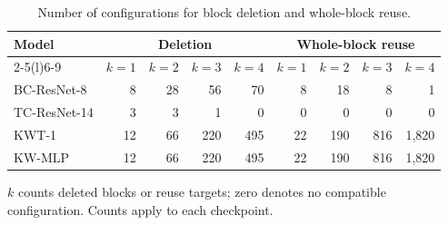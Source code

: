 \begin{table}[htbp]
\caption{Number of configurations for block deletion and whole-block reuse.}
\label{tab:structure_summary}
\centering\small
\setlength{\tabcolsep}{3pt}
\begin{tabular*}{\linewidth}{@{\extracolsep{\fill}}lrrrrrrrr@{}}
\toprule
\multirow{2}{*}{Model} & \multicolumn{4}{c}{Deletion} & \multicolumn{4}{c}{Whole-block reuse} \\
\cmidrule(lr){2-5}\cmidrule(l){6-9}
 & $k=1$ & $k=2$ & $k=3$ & $k=4$ & $k=1$ & $k=2$ & $k=3$ & $k=4$ \\
\midrule
BC-ResNet-8 & 8 & 28 & 56 & 70 & 8 & 18 & 8 & 1 \\
TC-ResNet-14 & 3 & 3 & 1 & 0 & 0 & 0 & 0 & 0 \\
KWT-1 & 12 & 66 & 220 & 495 & 22 & 190 & 816 & 1,820 \\
KW-MLP & 12 & 66 & 220 & 495 & 22 & 190 & 816 & 1,820 \\
\bottomrule
\end{tabular*}
\par\smallskip\begin{minipage}{\linewidth}\footnotesize
$k$ counts deleted blocks or reuse targets; zero denotes no compatible configuration. Counts apply to each checkpoint.
\end{minipage}
\end{table}
